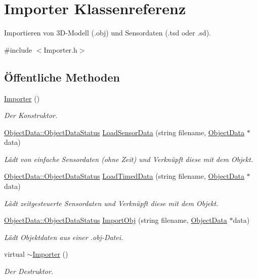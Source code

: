 \hypertarget{classImporter}{\section{Importer Klassenreferenz}
\label{classImporter}
}


Importieren von 3\-D-\/\-Modell (.obj) und Sensordaten (.tsd oder .sd).  




{\ttfamily \#include $<$Importer.\-h$>$}

\subsection*{Öffentliche Methoden}
\begin{DoxyCompactItemize}
\item 
\hyperlink{classImporter_afaf93b56e3558a92405ab627ab8ee1d1}{Importer} ()
\begin{DoxyCompactList}\small\item\em Der Konstruktor. \end{DoxyCompactList}\item 
\hyperlink{classObjectData_a20e8cd3cd0f8af3b571b9393aa9e6484}{Object\-Data\-::\-Object\-Data\-Status} \hyperlink{classImporter_ae837d750c92450f8e83b2d93eb099f79}{Load\-Sensor\-Data} (string filename, \hyperlink{classObjectData}{Object\-Data} $\ast$data)
\begin{DoxyCompactList}\small\item\em Lädt von einfache Sensordaten (ohne Zeit) und Verknüpft diese mit dem Objekt. \end{DoxyCompactList}\item 
\hyperlink{classObjectData_a20e8cd3cd0f8af3b571b9393aa9e6484}{Object\-Data\-::\-Object\-Data\-Status} \hyperlink{classImporter_ad8dec9ce375155ca130453632530eb52}{Load\-Timed\-Data} (string filename, \hyperlink{classObjectData}{Object\-Data} $\ast$data)
\begin{DoxyCompactList}\small\item\em Lädt zeitgesteuerte Sensordaten und Verknüpft diese mit dem Objekt. \end{DoxyCompactList}\item 
\hyperlink{classObjectData_a20e8cd3cd0f8af3b571b9393aa9e6484}{Object\-Data\-::\-Object\-Data\-Status} \hyperlink{classImporter_aaa567a75272f300157648ffaa9b101c2}{Import\-Obj} (string filename, \hyperlink{classObjectData}{Object\-Data} $\ast$data)
\begin{DoxyCompactList}\small\item\em Lädt Objektdaten aus einer .obj-\/\-Datei. \end{DoxyCompactList}\item 
virtual \hyperlink{classImporter_a6e61faae5020f2dc034ff3ea4032a537}{$\sim$\-Importer} ()
\begin{DoxyCompactList}\small\item\em Der Destruktor. \end{DoxyCompactList}\end{DoxyCompactItemize}


